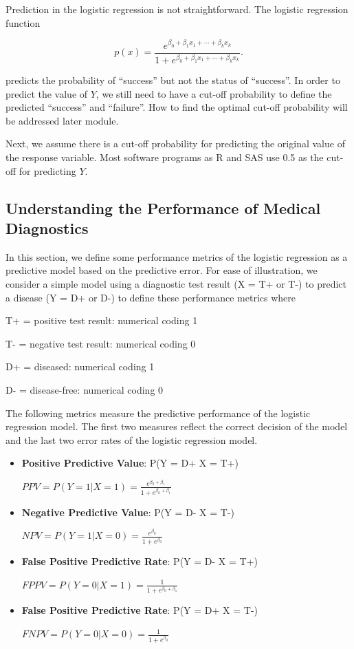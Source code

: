\documentclass[
]{book}
\begin{document}
Prediction in the logistic regression is not straightforward. The logistic regression function

\[
p(x) = \frac{e^{\beta_0 + \beta_1 x_1 +\cdots + \beta_kx_k}}{1 + e^{\beta_0 + \beta_1 x_1 + \cdots + \beta_kx_k}}.
\]

predicts the probability of ``success'' but not the status of ``success''. In order to predict the value of \(Y\), we still need to have a cut-off probability to define the predicted ``success'' and ``failure''. How to find the optimal cut-off probability will be addressed later module.

Next, we assume there is a cut-off probability for predicting the original value of the response variable. Most software programs as R and SAS use 0.5 as the cut-off for predicting \(Y\).

\hypertarget{understanding-the-performance-of-medical-diagnostics}{%
\subsection{Understanding the Performance of Medical Diagnostics}\label{understanding-the-performance-of-medical-diagnostics}}

In this section, we define some performance metrics of the logistic regression as a predictive model based on the predictive error. For ease of illustration, we consider a simple model using a diagnostic test result (X = T+ or T-) to predict a disease (Y = D+ or D-) to define these performance metrics where

T+ = positive test result: numerical coding 1

T- = negative test result: numerical coding 0

D+ = diseased: numerical coding 1

D- = disease-free: numerical coding 0

The following metrics measure the predictive performance of the logistic regression model. The first two measures reflect the correct decision of the model and the last two error rates of the logistic regression model.

\begin{itemize}
\item
  \textbf{Positive Predictive Value}: P(Y = D+ \textbar{} X = T+)

  \(PPV =P(Y=1|X=1)= \frac{e^{\beta_0+\beta_1}}{1+e^{\beta_0+\beta_1}}\)
\item
  \textbf{Negative Predictive Value}: P(Y = D- \textbar{} X = T-)

  \(NPV=P(Y=1|X=0)= \frac{e^{\beta_0}}{1+e^{\beta_0}}\)
\item
  \textbf{False Positive Predictive Rate}: P(Y = D- \textbar{} X = T+)

  \(FPPV=P(Y=0|X=1)= \frac{1}{1+e^{\beta_0+\beta_1}}\)
\item
  \textbf{False Positive Predictive Rate}: P(Y = D+ \textbar{} X = T-)

  \(FNPV=P(Y=0|X=0)= \frac{1}{1+e^{\beta_0}}\)
\end{itemize}
\end{document}

